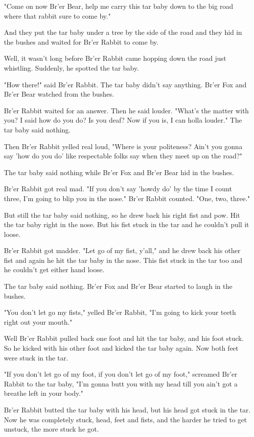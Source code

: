 "Come on now Br'er Bear, help me carry this tar baby down to the big road where that rabbit sure to come by."

And they put the tar baby under a tree by the side of the road and they hid in the bushes and waited for Br'er Rabbit to come by.

Well, it wasn't long before Br'er Rabbit came hopping down the road just whistling. Suddenly, he spotted the tar baby.

"How there!" said Br'er Rabbit. The tar baby didn't say anything. Br'er Fox and Br'er Bear watched from the bushes.

Br'er Rabbit waited for an answer. Then he said louder. "What's the matter with you? I said how do you do? Is you deaf? Now if you is, I can holla louder." The tar baby said nothing.

Then Br'er Rabbit yelled real loud, "Where is your politeness? Ain't you gonna say 'how do you do' like respectable folks say when they meet up on the road?"

The tar baby said nothing while Br'er Fox and Br'er Bear hid in the bushes.

Br'er Rabbit got real mad. "If you don't say 'howdy do' by the time I count three, I'm going to blip you in the nose." Br'er Rabbit counted. "One, two, three."

But still the tar baby said nothing, so he drew back his right fist and pow. Hit the tar baby right in the nose. But his fist stuck in the tar and he couldn't pull it loose.

Br'er Rabbit got madder. "Let go of my fist, y'all," and he drew back his other fist and again he hit the tar baby in the nose. This fist stuck in the tar too and he couldn't get either hand loose.

The tar baby said nothing. Br'er Fox and Br'er Bear started to laugh in the bushes.

"You don't let go my fists," yelled Br'er Rabbit, "I'm going to kick your teeth right out your mouth."

Well Br'er Rabbit pulled back one foot and hit the tar baby, and his foot stuck. So he kicked with his other foot and kicked the tar baby again. Now both feet were stuck in the tar.

"If you don't let go of my foot, if you don't let go of my foot," screamed Br'er Rabbit to the tar baby, "I'm gonna butt you with my head till you ain't got a breathe left in your body."

Br'er Rabbit butted the tar baby with his head, but his head got stuck in the tar. Now he was completely stuck, head, feet and fists, and the harder he tried to get unstuck, the more stuck he got.

